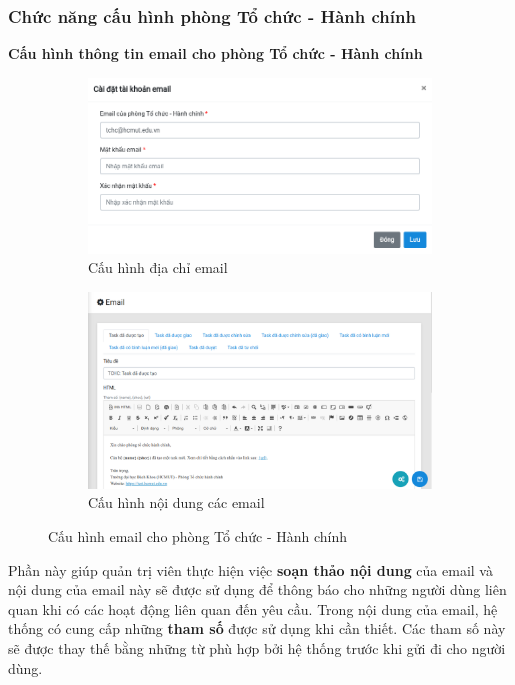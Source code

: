 \subsubsection{Chức năng cấu hình phòng Tổ chức - Hành chính}
\textbf{Cấu hình thông tin email cho phòng Tổ chức - Hành chính}
\begin{figure}[H]
    \centering
    \begin{subfigure}[b]{0.4\linewidth}
        \includegraphics[width=\linewidth]{img/Screen/emailsetting.png}
        \caption{Cấu hình địa chỉ email}
        \label{fig:email_setting}
    \end{subfigure}
    \begin{subfigure}[b]{0.4\linewidth}
        \includegraphics[width=\linewidth]{img/Screen/email.png}
        \caption{Cấu hình nội dung các email}
        \label{fig:email}
    \end{subfigure}
    \caption{Cấu hình email cho phòng Tổ chức - Hành chính}
\end{figure}

Phần này giúp quản trị viên thực hiện việc \textbf{soạn thảo nội dung} của email và nội dung của email này sẽ được sử dụng để thông báo cho những người dùng liên quan khi có các hoạt động liên quan đến yêu cầu. Trong nội dung của email, hệ thống có cung cấp những \textbf{tham số} được sử dụng khi cần thiết. Các tham số này sẽ được thay thế bằng những từ phù hợp bởi hệ thống trước khi gửi đi cho người dùng.\\

